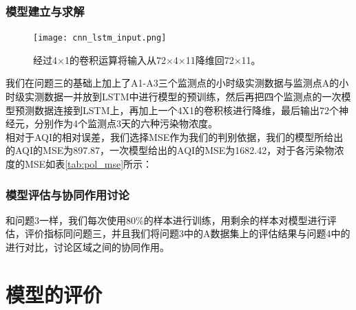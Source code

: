 \documentclass[bwprint]{gmcmthesis}
\numberwithin{figure}{section}
\begin{document}
\subsubsection{模型建立与求解}
\begin{figure}[!h]
	\centering
	\texttt{[image: cnn\_lstm\_input.png]}
	\caption{经过4×1的卷积运算将输入从72×4×11降维回72×11。}
	\label{CNN_LSTM-INPUT}
\end{figure}
我们在问题三的基础上加上了A1-A3三个监测点的小时级实测数据与监测点A的小时级实测数据一并放到LSTM中进行模型的预训练，然后再把四个监测点的一次模型预测数据连接到LSTM上，再加上一个4X1的卷积核进行降维，最后输出72个神经元，分别作为4个监测点3天的六种污染物浓度。\\
相对于AQI的相对误差，我们选择MSE作为我们的判别依据，我们的模型所给出的AQI的MSE为897.87，一次模型给出的AQI的MSE为1682.42，对于各污染物浓度的MSE如表\ref{tab:pol_mse}所示：
\begin{table}
	\caption{各污染物浓度MSE}\label{tab:pol_mse}
	\begin{center}
	\end{center}
\end{table}
\subsubsection{模型评估与协同作用讨论}
和问题3一样，我们每次使用80\%的样本进行训练，用剩余的样本对模型进行评估，评价指标同问题三，并且我们将问题3中的A数据集上的评估结果与问题4中的进行对比，讨论区域之间的协同作用。


\section{模型的评价}
\end{document}
